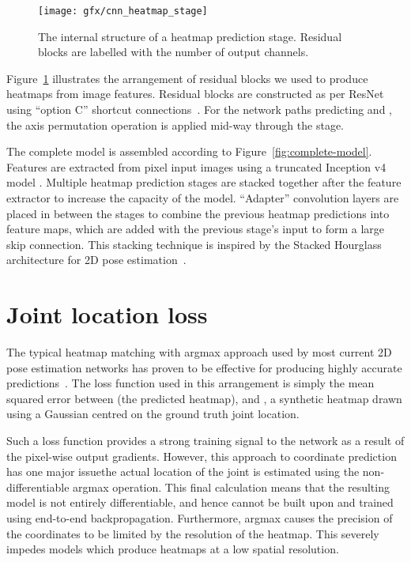 \documentclass[australian,10pt,twocolumn,letterpaper,twocolumn]{article}
\begin{document}
\begin{figure}
\begin{centering}
\texttt{[image: gfx/cnn\_heatmap\_stage]}
\par\end{centering}
\caption{\label{fig:chatterbox_stage}The internal structure of a heatmap prediction
stage. Residual blocks are labelled with the number of output channels.}
\end{figure}
Figure~\ref{fig:chatterbox_stage} illustrates the arrangement of
residual blocks we used to produce heatmaps from image features. Residual
blocks are constructed as per ResNet using ``option C'' shortcut
connections~\citep{he2016deep}. For the network paths predicting
 and , the axis permutation
operation is applied mid-way through the stage.

The complete model is assembled according to Figure~\ref{fig:complete-model}.
Features are extracted from  pixel input images using
a truncated Inception v4 model \citep{szegedy2017inception}. Multiple
heatmap prediction stages are stacked together after the feature extractor
to increase the capacity of the model. ``Adapter''  convolution
layers are placed in between the stages to combine the previous heatmap
predictions into feature maps, which are added with the previous stage's
input to form a large skip connection. This stacking technique is
inspired by the Stacked Hourglass architecture for 2D pose estimation~\citep{newell2016stacked}.

\section{Joint location loss}

The typical heatmap matching with argmax approach used by most current
2D pose estimation networks has proven to be effective for producing
highly accurate predictions~\citep{tompson2014joint,newell2016stacked}.
The loss function used in this arrangement is simply the mean squared
error between  (the predicted heatmap), and
, a synthetic heatmap drawn using a Gaussian
centred on the ground truth joint location.


Such a loss function provides a strong training signal to the network
as a result of the pixel-wise output gradients. However, this approach
to coordinate prediction has one major issue\textemdash the actual
location of the joint is estimated using the non-differentiable argmax
operation. This final calculation means that the resulting model is
not entirely differentiable, and hence cannot be built upon and trained
using end-to-end backpropagation. Furthermore, argmax causes the precision
of the coordinates to be limited by the resolution of the heatmap.
This severely impedes models which produce heatmaps at a low spatial
resolution.
\end{document}
